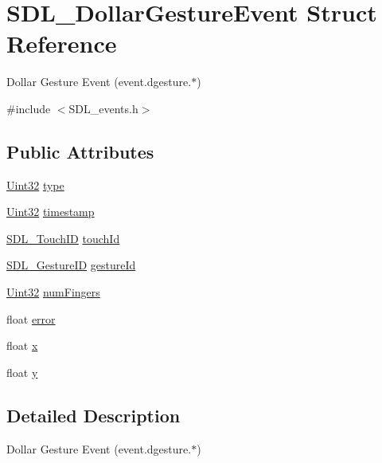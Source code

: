 \hypertarget{struct_s_d_l___dollar_gesture_event}{\section{S\-D\-L\-\_\-\-Dollar\-Gesture\-Event Struct Reference}
\label{struct_s_d_l___dollar_gesture_event}
}


Dollar Gesture Event (event.\-dgesture.$\ast$)  




{\ttfamily \#include $<$S\-D\-L\-\_\-events.\-h$>$}

\subsection*{Public Attributes}
\begin{DoxyCompactItemize}
\item 
\hyperlink{_s_d_l__stdinc_8h_add440eff171ea5f55cb00c4a9ab8672d}{Uint32} \hyperlink{struct_s_d_l___dollar_gesture_event_ac7f6948754a1b2eb36edde043bf75ce9}{type}
\item 
\hyperlink{_s_d_l__stdinc_8h_add440eff171ea5f55cb00c4a9ab8672d}{Uint32} \hyperlink{struct_s_d_l___dollar_gesture_event_a3bccd8ebdf30b79c0f4074f6471ec583}{timestamp}
\item 
\hyperlink{_s_d_l__touch_8h_a10f5f86abe4ea8308a8706bd5d3b337a}{S\-D\-L\-\_\-\-Touch\-I\-D} \hyperlink{struct_s_d_l___dollar_gesture_event_a40402f6911ed0dba48e6b23aa02bd83d}{touch\-Id}
\item 
\hyperlink{_s_d_l__gesture_8h_a6c06ab0de82701c94809da9739ff8ac3}{S\-D\-L\-\_\-\-Gesture\-I\-D} \hyperlink{struct_s_d_l___dollar_gesture_event_a68968438eae9e58208b14e8c954dec31}{gesture\-Id}
\item 
\hyperlink{_s_d_l__stdinc_8h_add440eff171ea5f55cb00c4a9ab8672d}{Uint32} \hyperlink{struct_s_d_l___dollar_gesture_event_a14160d8bad8569f53dd18ed8f64d253f}{num\-Fingers}
\item 
float \hyperlink{struct_s_d_l___dollar_gesture_event_a30aaa8fe0df93615e6692aa20e9c13eb}{error}
\item 
float \hyperlink{struct_s_d_l___dollar_gesture_event_a9888449bd8842ed96494b4db16a6097b}{x}
\item 
float \hyperlink{struct_s_d_l___dollar_gesture_event_a293b2303acc1cfc63c167c5525e6eab5}{y}
\end{DoxyCompactItemize}


\subsection{Detailed Description}
Dollar Gesture Event (event.\-dgesture.$\ast$) 

